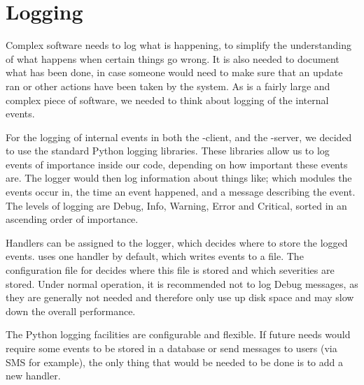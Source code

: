 \section{Logging}
Complex software needs to log what is happening, to simplify the understanding
of what happens when certain things go wrong. It is also needed
to document what has been done, in case someone would need to make sure that an
update ran or other actions have been taken by the system. As \snowman{} is a fairly
large and complex piece of software, we needed to think about logging of the internal
events.

For the logging of internal events in both the \snowman{}-client, and the
\snowman{}-server, we decided to use the standard Python logging libraries.
These libraries allow us to log events of importance inside our code,
depending on how important these events are. The logger would then log
information about things like; which modules the events occur in, the time an
event happened, and a message describing the event. The levels of logging
are Debug, Info, Warning, Error and Critical, sorted in an ascending order of
importance.

Handlers can be assigned to the logger, which decides where to store the logged
events. \snowman{} uses one handler by default, which writes events to a file.
The configuration file for \snowman{} decides where this file is stored and
which severities are stored. Under normal operation, it is recommended not to
log Debug messages, as they are generally not needed and therefore only use up
disk space and may slow down the overall performance.

The Python logging facilities are configurable and flexible. If future needs
would require some events to be stored in a database or send messages to users
(via SMS for example), the only thing that would be needed to be done is to
add a new handler.




